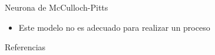 \documentclass[spanish]{beamer}
\begin{document}
\begin{frame}{Neurona de McCulloch-Pitts}
  \begin{itemize}
    \item Este modelo no es adecuado para realizar un proceso
  \end{itemize}
\end{frame}

\begin{frame}[t,allowframebreaks]{Referencias}
  \printbibliography[heading=none]
\end{frame}
\end{document}
